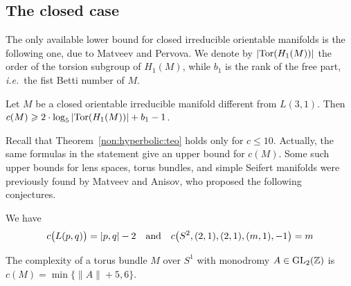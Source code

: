 \documentclass[10pt]{article}      %
\newcommand{\matZ} {\ensuremath {\mathbb{Z}}}
\begin{document}
\subsection{The closed case}
The only available lower bound 
for closed irreducible orientable manifolds is the following one, due to Matveev and 
Pervova. We denote by $|{\rm Tor}(H_1(M))|$ the order of the torsion subgroup
of $H_1(M)$, while $b_1$ is the rank of the free part, 
\emph{i.e.}~the fist Betti number of $M$.
\begin{theorem}
Let $M$ be a closed orientable irreducible manifold different from $L(3,1)$. 
Then $c(M)\geqslant
2\cdot\log_5|{\rm Tor}(H_1(M))|+b_1-1$.
\end{theorem}
Recall that Theorem~\ref{non:hyperbolic:teo} holds only for $c\leqslant 10$. Actually,
the same formulas in the statement give an upper bound for $c(M)$. Some such
upper bounds for lens spaces, torus bundles, and simple Seifert manifolds
were previously found by Matveev and Anisov, 
who proposed the following conjectures.
\begin{conjecture} We have
$$c\big(L(p,q)\big) = |p,q|-2 \quad {\rm and} \quad c\big(S^2,(2,1),(2,1),(m,1),-1\big) = m$$
\end{conjecture}
\begin{conjecture}
The complexity of a torus bundle $M$ over $S^1$ with monodromy $A\in\GL_2(\matZ)$ is
$c(M) = \min\{\|A\|+5, 6\}.$
\end{conjecture}
\end{document}
